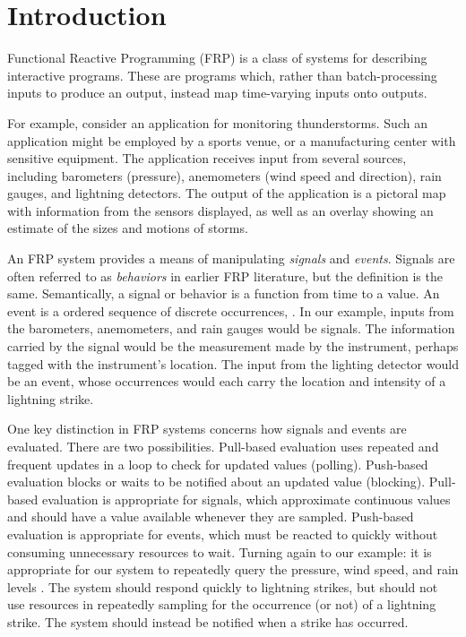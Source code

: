 \section{Introduction}
\label{section:Introduction}

Functional Reactive Programming (FRP) is a class of systems for describing
interactive programs. These are programs which, rather than batch-processing
inputs to produce an output, instead map time-varying inputs onto outputs.

For example, consider an application for monitoring thunderstorms. Such an
application might be employed by a sports venue, or a manufacturing center with
sensitive equipment. The application receives input from several sources,
including barometers (pressure), anemometers (wind speed and direction), rain
gauges, and lightning detectors. The output of the application is a pictoral map
with information from the sensors displayed, as well as an overlay showing an
estimate of the sizes and motions of storms.

An FRP system provides a means of manipulating {\em signals} and
{\em events}. Signals are often referred to as {\em behaviors} in earlier FRP literature,
but the definition is the same.  Semantically, a signal or behavior is a
function from time to a value. An event is a ordered sequence of discrete
occurrences, . In our example, inputs from
the barometers, anemometers, and rain gauges would be signals. The
information carried by the signal would be the measurement made by the
instrument, perhaps tagged with the instrument's location. The input from the
lighting detector would be an event, whose occurrences would each carry the
location and intensity of a lightning strike.

One key distinction in FRP systems concerns how signals and events are
evaluated. There are two possibilities. Pull-based evaluation uses repeated and
frequent updates in a loop to check for updated values (polling).
Push-based
evaluation blocks or waits to be notified about an updated value (blocking).
Pull-based evaluation is appropriate for signals,
which approximate continuous values and should have a value available whenever
they are sampled. Push-based evaluation is appropriate for events, which must be
reacted to quickly without consuming unnecessary resources to wait. Turning
again to our example: it is appropriate for our system to repeatedly query the
pressure, wind speed, and rain levels . The system should respond quickly to
lightning strikes, but should not use resources in repeatedly sampling for the
occurrence (or not) of a lightning strike.  The system should instead be notified
when a strike has occurred.  

